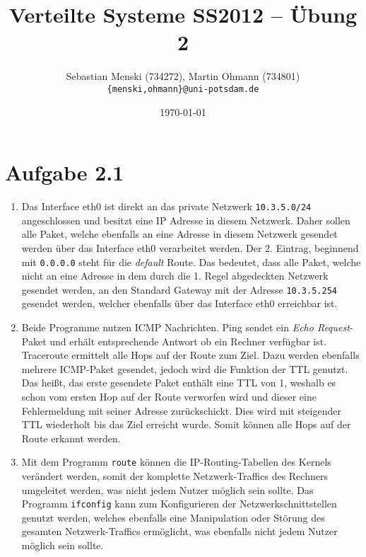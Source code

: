\documentclass[german,12pt,a4paper]{article}
\begin{document}
\title{\textbf{Verteilte Systeme SS2012 -- Übung 2}}
\author{Sebastian Menski (734272), Martin Ohmann (734801) \\ \texttt{\{menski,ohmann\}@uni-potsdam.de}}
\date{\today}

\maketitle

\section*{Aufgabe 2.1}

\begin{enumerate}

	\item Das Interface eth0 ist direkt an das private Netzwerk \texttt{10.3.5.0/24} angeschlossen und
	besitzt eine IP Adresse in diesem Netzwerk. Daher sollen alle Paket, welche ebenfalls an eine
	Adresse in diesem Netzwerk gesendet werden über das Interface eth0 verarbeitet werden. Der 2.
	Eintrag, beginnend mit \texttt{0.0.0.0} steht für die \textit{default} Route. Das bedeutet, dass
	alle Paket, welche nicht an eine Adresse in dem durch die 1. Regel abgedeckten Netzwerk gesendet
	werden, an den Standard Gateway mit der Adresse \texttt{10.3.5.254} gesendet werden, welcher
	ebenfalls über das Interface eth0 erreichbar ist.

	\item Beide Programme nutzen ICMP Nachrichten. Ping sendet ein \textit{Echo Request}-Paket und
	erhält entsprechende Antwort ob ein Rechner verfügbar ist. Traceroute ermittelt alle Hops auf der
	Route zum Ziel. Dazu werden ebenfalls mehrere ICMP-Paket gesendet, jedoch wird die Funktion der
	TTL genutzt. Das heißt, das erste gesendete Paket enthält eine TTL von 1, weshalb es schon vom
	ersten Hop auf der Route verworfen wird und dieser eine Fehlermeldung mit seiner Adresse
	zurückschickt. Dies wird mit steigender TTL wiederholt bis das Ziel erreicht wurde. Somit können
	alle Hops auf der Route erkannt werden.

	\item Mit dem Programm \texttt{route} können die IP-Routing-Tabellen des Kernels verändert werden,
	somit der komplette Netzwerk-Traffics des Rechners umgeleitet werden, was nicht jedem Nutzer
	möglich sein sollte. Das Programm \texttt{ifconfig} kann zum Konfigurieren der
	Netzwerkschnittstellen genutzt werden, welches ebenfalls eine Manipulation oder Störung des
	gesamten Netzwerk-Traffics ermöglicht, was ebenfalls nicht jedem Nutzer möglich sein sollte.

\end{enumerate}
\end{document}
